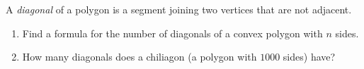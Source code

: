 A \emph{diagonal} of a polygon is a segment joining two vertices that are not adjacent.
\begin{enumerate}
\item[(a)] Find a formula for the number of diagonals of a convex polygon with $n$ sides.
\item[(b)] How many diagonals does a chiliagon (a polygon with $1000$ sides) have?
\end{enumerate}
